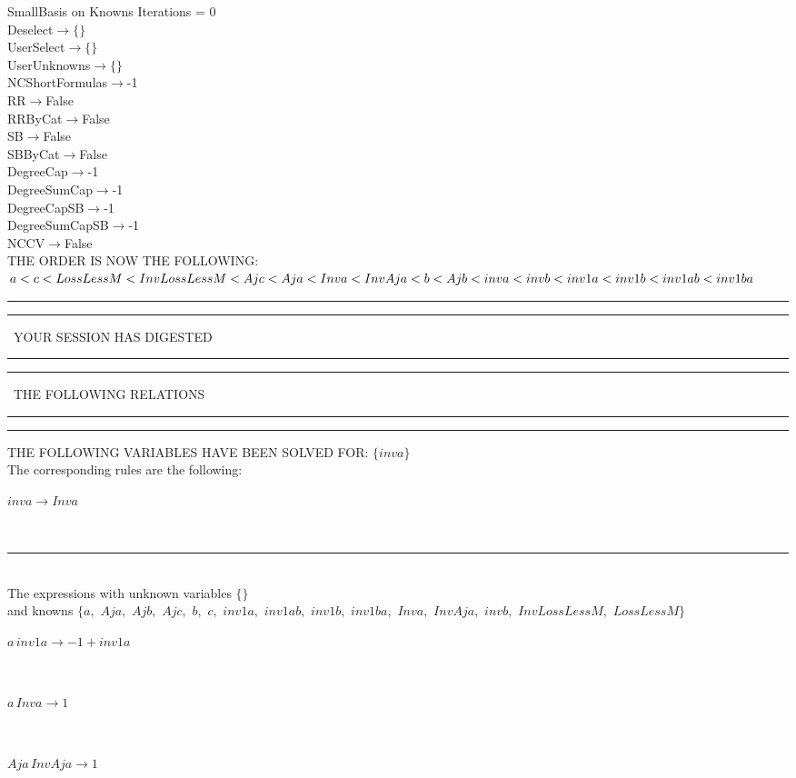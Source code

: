 \documentclass[rep10,leqno]{report}
\begin{document}
SmallBasis on Knowns Iterations = 0\\
Deselect$\rightarrow \{\}$\\
UserSelect$\rightarrow \{\}$\\
UserUnknowns$\rightarrow \{\}$\\
NCShortFormulas$\rightarrow$-1\\
RR$\rightarrow $False\\
RRByCat$\rightarrow $False\\
SB$\rightarrow $False\\
SBByCat$\rightarrow $False\\
DegreeCap$\rightarrow $-1\\
DegreeSumCap$\rightarrow $-1\\
DegreeCapSB$\rightarrow $-1\\
DegreeSumCapSB$\rightarrow $-1\\
NCCV$\rightarrow $False\\
THE ORDER IS NOW THE FOLLOWING:\hfil\break
$
a<c<LossLessM<InvLossLessM<Ajc<Aja<Inva<InvAja<b<Ajb<inva<invb<inv1a<inv1b<inv1ab<inv1ba\\
$
\rule[2pt]{6in}{4pt}\hfil\break
\rule[2pt]{1.879in}{4pt}
\ YOUR SESSION HAS DIGESTED\ 
\rule[2pt]{1.879in}{4pt}\hfil\break
\rule[2pt]{1.923in}{4pt}
\ THE FOLLOWING RELATIONS\ 
\rule[2pt]{1.923in}{4pt}\hfil\break
\rule[2pt]{6in}{4pt}\hfil\break
THE FOLLOWING VARIABLES HAVE BEEN SOLVED FOR:\hfil\break
$\{inva\}$
\smallskip\\
The corresponding rules are the following:\smallskip\\
\begin{minipage}{6in}
$
inva\rightarrow Inva
$
\end{minipage}\medskip\\
\rule[3pt]{6in}{.7pt}\\
The expressions with unknown variables $\{\}$\\
and knowns $\{a,
$ $
Aja,
$ $
Ajb,
$ $
Ajc,
$ $
b,
$ $
c,
$ $
inv1a,
$ $
inv1ab,
$ $
inv1b,
$ $
inv1ba,
$ $
Inva,
$ $
InvAja,
$ $
invb,
$ $
InvLossLessM,
$ $
LossLessM\}$\smallskip\\
\begin{minipage}{6in}
$
a\,
 inv1a\rightarrow -1 + inv1a
$
\end{minipage}\medskip \\
\begin{minipage}{6in}
$
a\,
 Inva\rightarrow 1
$
\end{minipage}\medskip \\
\begin{minipage}{6in}
$
Aja\,
 InvAja\rightarrow 1
$
\end{minipage}\medskip \\
\end{document}
